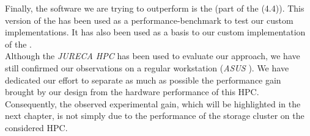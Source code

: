 		Finally, the software we are trying to outperform is the \toolTargetSoftware\space (part of the \toolTraceAnalyzed\space (4.4)).   This version of the \toolTargetSoftware\space has been used as a performance-benchmark to test our custom implementations.   It has also been used as a basis to our custom implementation of the \toolTargetSoftware.\\

		Although the \emph{JURECA HPC} has been used to evaluate our approach, we have still confirmed our observations on a regular workstation (\emph{ASUS} \targetPlatformLaptop).   We have dedicated our effort to separate as much as possible the performance gain brought by our design from the hardware performance of this HPC.   Consequently, the observed experimental gain, which will be highlighted in the next chapter, is not simply due to the performance of the storage cluster on the considered HPC.




